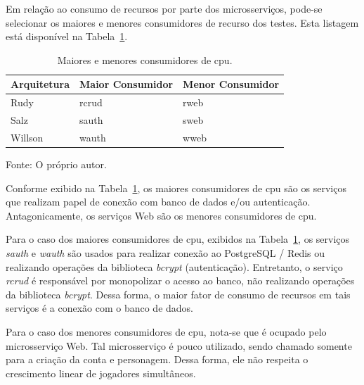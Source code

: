 Em relação ao consumo de recursos por parte dos microsserviços, pode-se selecionar os maiores e menores consumidores de recurso dos testes.
%
Esta listagem está disponível na Tabela~\ref{tab:cpu_consumo_max_min}.

\begin{table}[htb!]
\centering
\begin{adjustbox}{max width=\textwidth}
\caption{Maiores e menores consumidores de \ac{cpu}.}
\label{tab:cpu_consumo_max_min}
\begin{tabular}{|l|l|l|}

\hline

Arquitetura & Maior Consumidor & Menor Consumidor \\ \hline

Rudy        & rcrud            & rweb             \\ \hline

Salz        & sauth            & sweb             \\ \hline

Willson     & wauth             & wweb             \\ \hline

\end{tabular}
\end{adjustbox}

Fonte: O próprio autor.
\end{table}

Conforme exibido na Tabela~\ref{tab:cpu_consumo_max_min}, os maiores consumidores de \ac{cpu} são os serviços que realizam papel de conexão com banco de dados e/ou autenticação.
%
Antagonicamente, os serviços Web são os menores consumidores de \ac{cpu}.

Para o caso dos maiores consumidores de \ac{cpu}, exibidos na Tabela~\ref{tab:cpu_consumo_max_min}, os serviços \textit{sauth} e \textit{wauth} são usados para realizar conexão ao PostgreSQL / Redis ou realizando operações da biblioteca \textit{bcrypt} (autenticação).
%
Entretanto, o serviço \textit{rcrud} é responsável por monopolizar o acesso ao banco, não realizando operações da biblioteca \textit{bcrypt}.
%
Dessa forma, o maior fator de consumo de recursos em tais serviços é a conexão com o banco de dados.

Para o caso dos menores consumidores de \ac{cpu}, nota-se que é ocupado pelo microsserviço Web.
%
Tal microsserviço é pouco utilizado, sendo chamado somente para a criação da conta e personagem.
%
Dessa forma, ele não respeita o crescimento linear de jogadores simultâneos.

